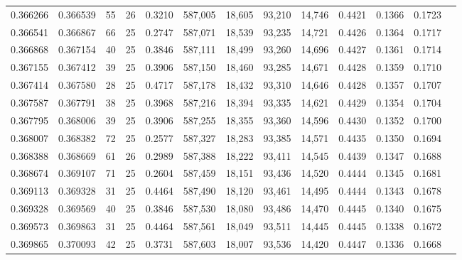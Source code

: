\begin{tabular}{rrrrrrrrrrrrr}
0.366266 & 0.366539 &    55 &  26 &                                     0.3210 & 587,005 &  18,605 &  93,210 &  14,746 & 0.4421 & 0.1366 & 0.1723 \\
0.366541 & 0.366867 &    66 &  25 &                                     0.2747 & 587,071 &  18,539 &  93,235 &  14,721 & 0.4426 & 0.1364 & 0.1717 \\
0.366868 & 0.367154 &    40 &  25 &                                     0.3846 & 587,111 &  18,499 &  93,260 &  14,696 & 0.4427 & 0.1361 & 0.1714 \\
0.367155 & 0.367412 &    39 &  25 &                                     0.3906 & 587,150 &  18,460 &  93,285 &  14,671 & 0.4428 & 0.1359 & 0.1710 \\
0.367414 & 0.367580 &    28 &  25 &                                     0.4717 & 587,178 &  18,432 &  93,310 &  14,646 & 0.4428 & 0.1357 & 0.1707 \\
0.367587 & 0.367791 &    38 &  25 &                                     0.3968 & 587,216 &  18,394 &  93,335 &  14,621 & 0.4429 & 0.1354 & 0.1704 \\
0.367795 & 0.368006 &    39 &  25 &                                     0.3906 & 587,255 &  18,355 &  93,360 &  14,596 & 0.4430 & 0.1352 & 0.1700 \\
0.368007 & 0.368382 &    72 &  25 &                                     0.2577 & 587,327 &  18,283 &  93,385 &  14,571 & 0.4435 & 0.1350 & 0.1694 \\
0.368388 & 0.368669 &    61 &  26 &                                     0.2989 & 587,388 &  18,222 &  93,411 &  14,545 & 0.4439 & 0.1347 & 0.1688 \\
0.368674 & 0.369107 &    71 &  25 &                                     0.2604 & 587,459 &  18,151 &  93,436 &  14,520 & 0.4444 & 0.1345 & 0.1681 \\
0.369113 & 0.369328 &    31 &  25 &                                     0.4464 & 587,490 &  18,120 &  93,461 &  14,495 & 0.4444 & 0.1343 & 0.1678 \\
0.369328 & 0.369569 &    40 &  25 &                                     0.3846 & 587,530 &  18,080 &  93,486 &  14,470 & 0.4445 & 0.1340 & 0.1675 \\
0.369573 & 0.369863 &    31 &  25 &                                     0.4464 & 587,561 &  18,049 &  93,511 &  14,445 & 0.4445 & 0.1338 & 0.1672 \\
0.369865 & 0.370093 &    42 &  25 &                                     0.3731 & 587,603 &  18,007 &  93,536 &  14,420 & 0.4447 & 0.1336 & 0.1668 \\

\end{tabular}
